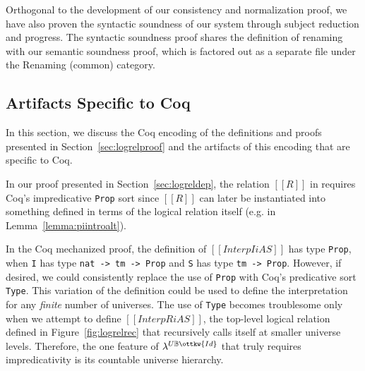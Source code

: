 \documentclass[acmsmall,screen=true,
\ifpublic review=false\else,review=true\fi
  ,anonymous=\ifanonymous true\else false\fi]{acmart}
\newcommand{\lang}{$\lambda^{U\mathbb{B}\ottkw{Id}}$\xspace}
\newcommand{\scw}[1]{}
\newcommand{\yl}[1]{}
\begin{document}
Orthogonal to the development of our consistency and normalization
proof, we have also proven the syntactic soundness of our system through subject
reduction and progress. The syntactic soundness proof shares the
definition of renaming with our semantic soundness proof, which is
factored out as a separate file under the Renaming (common) category.
\scw{Should add this line count as another column, for comparison. I've done so,
but may need to update the numbers. }

\subsection{Artifacts Specific to Coq}
In this section, we discuss the Coq encoding of the definitions and proofs presented
in Section~\ref{sec:logrelproof} and the artifacts of this encoding that are
specific to Coq.


In our proof presented in Section~\ref{sec:logreldep}, the relation
$[[R]]$ in  requires Coq's impredicative \texttt{Prop} sort
since $[[R]]$ can later be instantiated into something defined in
terms of the logical relation itself (e.g. in
Lemma~\ref{lemma:piintroalt}). \scw{I'm having trouble connecting the rule in
the figure with rule \texttt{InterpExtFun} in the coq development. Would it make
sense to include the definition of ProdSpace? What is the Coq type of R?}
\yl{I think I might just inline the definition of ProdSpace and then
  rename the variables from the Coq code to match the ones from the paper}

In the Coq mechanized proof, the definition of $[[Interp I i A S]]$ has type
\texttt{Prop}, when \texttt{I} has type \texttt{nat -> tm -> Prop} and \texttt{S}
has type \texttt {tm -> Prop}.  However, if desired, we could consistently
replace the use of \texttt{Prop} with Coq's predicative sort
\texttt{Type}. This variation of the definition could be used to define the
interpretation for any \emph{finite} number of universes. The use of
\texttt{Type} becomes troublesome only when we attempt to define
$[[InterpR i A S]]$, the top-level logical relation defined in
Figure~\ref{fig:logrelrec} that recursively calls itself at smaller universe
levels. Therefore, the one feature of \lang{} that truly requires impredicativity
is its countable universe hierarchy. \scw{I'm not sure the last part of this sentence
adds much: ``Although, lemmas such as the
admissibility of \rref{I-PiAlt} (Lemma~\ref{lemma:piintroalt}) not only simply
our mechanization, but also give better intuition on what our logical relation
means.'' Yes, we need impredicativity to define these lemmas, but without impredicativity
our logical relation means something else.}
\end{document}
